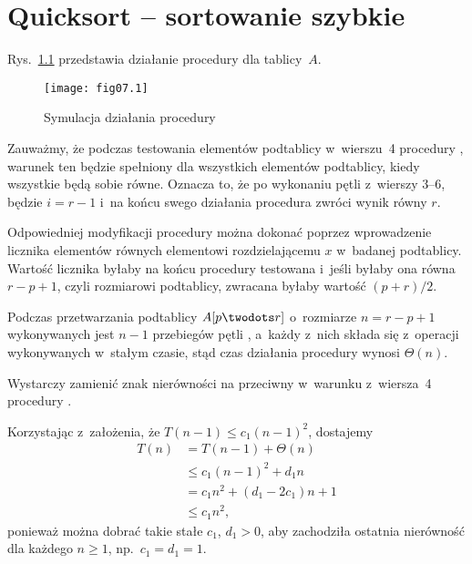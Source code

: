 \chapter{Quicksort -- sortowanie szybkie}


\exercise %
Rys.~\ref{fig:7.1-1} przedstawia działanie procedury  dla tablicy~$A$.
\begin{figure}[!h]
	\begin{center}
		\texttt{[image: fig07.1]}
	\end{center}
	\caption{Symulacja działania procedury } \label{fig:7.1-1}
\end{figure}

\exercise %
Zauważmy, że podczas testowania elementów podtablicy w~wierszu~4 procedury , warunek ten będzie spełniony dla wszystkich elementów podtablicy, kiedy wszystkie będą sobie równe. Oznacza to, że po wykonaniu pętli  z~wierszy 3\nobreakdash--6, będzie $i=r-1$ i~na końcu swego działania procedura zwróci wynik równy $r$.

Odpowiedniej modyfikacji procedury można dokonać poprzez wprowadzenie licznika elementów równych elementowi rozdzielającemu $x$ w~badanej podtablicy. Wartość licznika byłaby na końcu procedury testowana i~jeśli byłaby ona równa $r-p+1$, czyli rozmiarowi podtablicy, zwracana byłaby wartość $(p+r)/2$.

\exercise %
Podczas przetwarzania podtablicy $A[p\twodots r]$ o~rozmiarze $n=r-p+1$ wykonywanych jest $n-1$ przebiegów pętli , a~każdy z~nich składa się z~operacji wykonywanych w~stałym czasie, stąd czas działania procedury wynosi $\Theta(n)$.

\exercise %
Wystarczy zamienić znak nierówności na przeciwny w~warunku z~wiersza~4 procedury .


\exercise %
Korzystając z~założenia, że $T(n-1)\le c_1(n-1)^2$, dostajemy
\begin{align*}
	T(n) &= T(n-1)+\Theta(n) \\
	&\le c_1(n-1)^2+d_1n \\
	&= c_1n^2+(d_1-2c_1)n+1 \\
	&\le c_1n^2,
\end{align*}
ponieważ można dobrać takie stałe $c_1$, $d_1>0$, aby zachodziła ostatnia nierówność dla każdego $n\ge1$, np.\ $c_1=d_1=1$.

